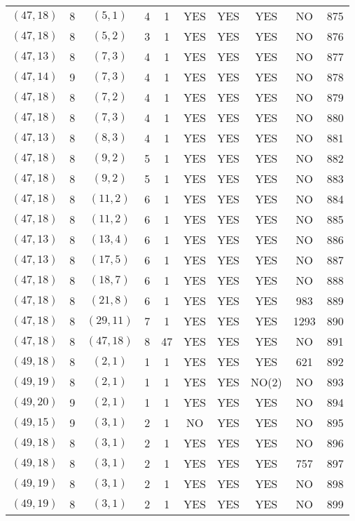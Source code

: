 \begin{longtable}{|c|c|c|c|c|c|c|c|c|c|}
$(47, 18)$ & 8 & $(5, 1)$ & 4 & 1 & YES & YES & YES & NO & 875\\
$(47, 18)$ & 8 & $(5, 2)$ & 3 & 1 & YES & YES & YES & NO & 876\\
$(47, 13)$ & 8 & $(7, 3)$ & 4 & 1 & YES & YES & YES & NO & 877\\
$(47, 14)$ & 9 & $(7, 3)$ & 4 & 1 & YES & YES & YES & NO & 878\\
$(47, 18)$ & 8 & $(7, 2)$ & 4 & 1 & YES & YES & YES & NO & 879\\
$(47, 18)$ & 8 & $(7, 3)$ & 4 & 1 & YES & YES & YES & NO & 880\\
$(47, 13)$ & 8 & $(8, 3)$ & 4 & 1 & YES & YES & YES & NO & 881\\
$(47, 18)$ & 8 & $(9, 2)$ & 5 & 1 & YES & YES & YES & NO & 882\\
$(47, 18)$ & 8 & $(9, 2)$ & 5 & 1 & YES & YES & YES & NO & 883\\
$(47, 18)$ & 8 & $(11, 2)$ & 6 & 1 & YES & YES & YES & NO & 884\\
$(47, 18)$ & 8 & $(11, 2)$ & 6 & 1 & YES & YES & YES & NO & 885\\
$(47, 13)$ & 8 & $(13, 4)$ & 6 & 1 & YES & YES & YES & NO & 886\\
$(47, 13)$ & 8 & $(17, 5)$ & 6 & 1 & YES & YES & YES & NO & 887\\
$(47, 18)$ & 8 & $(18, 7)$ & 6 & 1 & YES & YES & YES & NO & 888\\
$(47, 18)$ & 8 & $(21, 8)$ & 6 & 1 & YES & YES & YES & 983 & 889\\
$(47, 18)$ & 8 & $(29, 11)$ & 7 & 1 & YES & YES & YES & 1293 & 890\\
$(47, 18)$ & 8 & $(47, 18)$ & 8 & 47 & YES & YES & YES & NO & 891\\
$(49, 18)$ & 8 & $(2, 1)$ & 1 & 1 & YES & YES & YES & 621 & 892\\
$(49, 19)$ & 8 & $(2, 1)$ & 1 & 1 & YES & YES & NO(2) & NO & 893\\
$(49, 20)$ & 9 & $(2, 1)$ & 1 & 1 & YES & YES & YES & NO & 894\\
$(49, 15)$ & 9 & $(3, 1)$ & 2 & 1 & NO & YES & YES & NO & 895\\
$(49, 18)$ & 8 & $(3, 1)$ & 2 & 1 & YES & YES & YES & NO & 896\\
$(49, 18)$ & 8 & $(3, 1)$ & 2 & 1 & YES & YES & YES & 757 & 897\\
$(49, 19)$ & 8 & $(3, 1)$ & 2 & 1 & YES & YES & YES & NO & 898\\
$(49, 19)$ & 8 & $(3, 1)$ & 2 & 1 & YES & YES & YES & NO & 899\\

\end{longtable}
